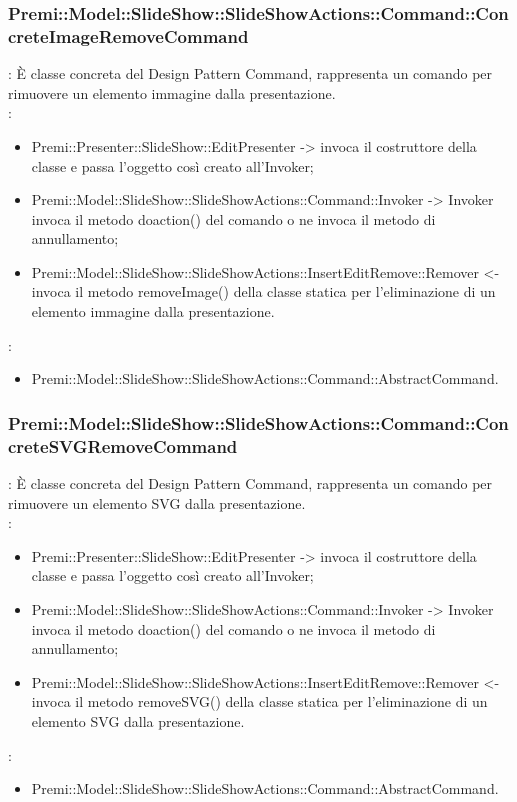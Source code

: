 {                    \subsubsection{Premi::Model::SlideShow::SlideShowActions::Command::ConcreteImageRemoveCommand}{
				\textbf{\tipo}: È classe concreta del Design Pattern Command, rappresenta un comando per rimuovere un elemento immagine dalla presentazione.\\	
				\textbf{\relaz}: 
				\begin{itemize}
					\item Premi::Presenter::SlideShow::EditPresenter -> invoca il costruttore della classe e passa l’oggetto così creato all’Invoker;
					\item Premi::Model::SlideShow::SlideShowActions::Command::Invoker -> Invoker invoca il metodo doaction() del comando o ne invoca il metodo di annullamento;
                    \item Premi::Model::SlideShow::SlideShowActions::InsertEditRemove::Remover <- invoca il metodo removeImage() della classe statica per l’eliminazione di un elemento immagine dalla presentazione.
				\end{itemize}	
                \textbf{\base}: 
                    \begin{itemize}
                    \item Premi::Model::SlideShow::SlideShowActions::Command::AbstractCommand.
                    \end{itemize}
                    }               
                    \subsubsection{Premi::Model::SlideShow::SlideShowActions::Command::ConcreteSVGRemoveCommand}{
				\textbf{\tipo}: È classe concreta del Design Pattern Command, rappresenta un comando per rimuovere un elemento SVG dalla presentazione.\\	
				\textbf{\relaz}: 
				\begin{itemize}
					\item Premi::Presenter::SlideShow::EditPresenter -> invoca il costruttore della classe e passa l’oggetto così creato all’Invoker;
					\item Premi::Model::SlideShow::SlideShowActions::Command::Invoker -> Invoker invoca il metodo doaction() del comando o ne invoca il metodo di annullamento;
                    \item Premi::Model::SlideShow::SlideShowActions::InsertEditRemove::Remover <- invoca il metodo removeSVG() della classe statica per l’eliminazione di un elemento SVG dalla presentazione.
				\end{itemize}	
                \textbf{\base}: 
                    \begin{itemize}
                    \item Premi::Model::SlideShow::SlideShowActions::Command::AbstractCommand.
                    \end{itemize}
                    }
}
